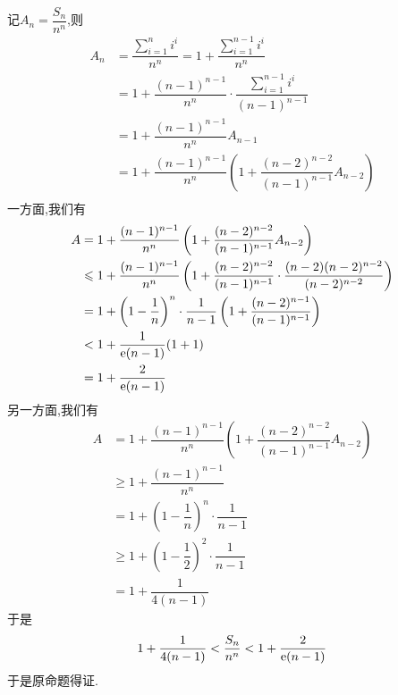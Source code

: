 \documentclass{ctexart}
\begin{document}
\begin{solution}[Proof.]
    记$A_n=\dfrac{S_n}{n^n}$,则
    $$\begin{aligned}
        A_n
        &= \dfrac{\sum_{i=1}^{n}i^i}{n^n}
        = 1+\dfrac{\sum_{i=1}^{n-1}i^i}{n^n} \\
        &= 1+\dfrac{(n-1)^{n-1}}{n^n}\cdot\dfrac{\sum_{i=1}^{n-1}i^i}{(n-1)^{n-1}} \\
        &= 1+\dfrac{(n-1)^{n-1}}{n^n}A_{n-1} \\
        &= 1+\dfrac{(n-1)^{n-1}}{n^n}\left(1+\dfrac{(n-2)^{n-2}}{(n-1)^{n-1}}A_{n-2}\right) \\
    \end{aligned}$$
    一方面,我们有
    $$\begin{aligned}
        A
        &= 1+\dfrac{(n-1)^{n-1}}{n^n}\left(1+\dfrac{(n-2)^{n-2}}{(n-1)^{n-1}}A_{n-2}\right) \\
        &\leqslant 1+\dfrac{(n-1)^{n-1}}{n^n}\left(1+\dfrac{(n-2)^{n-2}}{(n-1)^{n-1}}\cdot\dfrac{(n-2)(n-2)^{n-2}}{(n-2)^{n-2}}\right) \\
        &= 1+\left(1-\dfrac{1}{n}\right)^{n}\cdot\dfrac{1}{n-1}\left(1+\dfrac{(n-2)^{n-1}}{(n-1)^{n-1}}\right) \\
        &< 1+\dfrac{1}{\mathrm{e}(n-1)}(1+1) \\
        &= 1+\dfrac{2}{\mathrm{e}(n-1)}
    \end{aligned}$$
    另一方面,我们有
    $$\begin{aligned}
        A
        &= 1+\dfrac{(n-1)^{n-1}}{n^n}\left(1+\dfrac{(n-2)^{n-2}}{(n-1)^{n-1}}A_{n-2}\right) \\
        &\geqslant 1+\dfrac{(n-1)^{n-1}}{n^n} \\
        &= 1+\left(1-\dfrac{1}{n}\right)^{n}\cdot\dfrac{1}{n-1} \\
        &\geqslant 1+\left(1-\dfrac{1}{2}\right)^{2}\cdot\dfrac{1}{n-1} \\
        &= 1+\dfrac{1}{4(n-1)}
    \end{aligned}$$
    于是$$1+\dfrac{1}{4(n-1)}<\dfrac{S_n}{n^n}<1+\dfrac{2}{\mathrm{e}(n-1)}$$
    于是原命题得证.
\end{solution}
\end{document}
